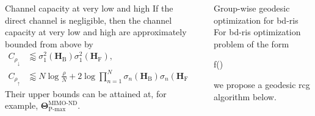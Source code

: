 \documentclass[final,xcolor={table}]{beamer}
\newlength{\sepwidth}
\newlength{\colwidth}
\newcommand{\separatorcolumn}{\begin{column}{\sepwidth}\end{column}}
\begin{document}
\begin{frame}[t]
\begin{columns}[t]
\begin{column}{\colwidth}
			\begin{coro}{Channel capacity at very low and high }{}
				\setlength{\leftskip}{\leftmargini}
				\setlength{\rightskip}{\leftmargini}
				If the direct channel is negligible, then the channel capacity at very low and high  are approximately bounded from above by
				\begin{align*}
					C_{\rho_\downarrow} & \lessapprox \sigma_1^2(\mathbf{H}_\mathrm{B}) \sigma_1^2(\mathbf{H}_\mathrm{F}), \\
					C_{\rho_\uparrow} & \lessapprox N \log \frac{\rho}{N} + 2 \log \prod\nolimits_{n=1}^N \sigma_n(\mathbf{H}_\mathrm{B}) \sigma_n(\mathbf{H}_\mathrm{F}).
				\end{align*}
				Their upper bounds can be attained at, for example, $\mathbf{\Theta}_\text{P-max}^\text{MIMO-ND}$.
			\end{coro}
		\end{column}

		\separatorcolumn

		\begin{column}{\colwidth}
			\vspace{-0.5cm}
			\begin{algo}{Group-wise geodesic optimization for \gls{bd}-\gls{ris}}{}
				\setlength{\leftskip}{\leftmargini}
				\setlength{\rightskip}{\leftmargini}
				For \gls{bd}-\gls{ris} optimization problem of the form
				\begin{maxi*}
					{\scriptstyle{\mathbf{\Theta}}}{f(\mathbf{\Theta})}{}{}
					\addConstraint{\mathbf{\Theta}_g^\mathsf{H} \mathbf{\Theta}_g=\mathbf{I},}{\quad \forall g,}{}
				\end{maxi*}
				we propose a \textcolor{pink!50!pink!75!black}{geodesic} \gls{rcg} algorithm below.
				\vspace{0.5cm}


\end{algo}
\end{column}
\end{columns}
\end{frame}
\end{document}
